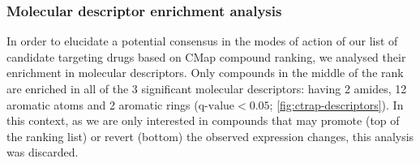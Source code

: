 \subsubsection{Molecular descriptor enrichment analysis}

In order to elucidate a potential consensus in the modes of action of our list of candidate targeting drugs based on CMap compound ranking, we analysed their enrichment in molecular descriptors. Only compounds in the middle of the rank are enriched in all of the 3 significant molecular descriptors: having 2 amides, 12 aromatic atoms and 2 aromatic rings ($\textrm{q-value} < 0.05$; \autoref{fig:ctrap-descriptors}). In this context, as we are only interested in compounds that may promote (top of the ranking list) or revert (bottom) the observed expression changes, this analysis was discarded.

